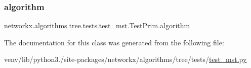 \subsubsection{\texorpdfstring{algorithm}{algorithm}}
{\footnotesize\ttfamily networkx.\+algorithms.\+tree.\+tests.\+test\+\_\+mst.\+Test\+Prim.\+algorithm\hspace{0.3cm}{\ttfamily [static]}}



The documentation for this class was generated from the following file\+:\begin{DoxyCompactItemize}
\item 
venv/lib/python3./site-\/packages/networkx/algorithms/tree/tests/\hyperlink{test__mst_8py}{test\+\_\+mst.\+py}\end{DoxyCompactItemize}
